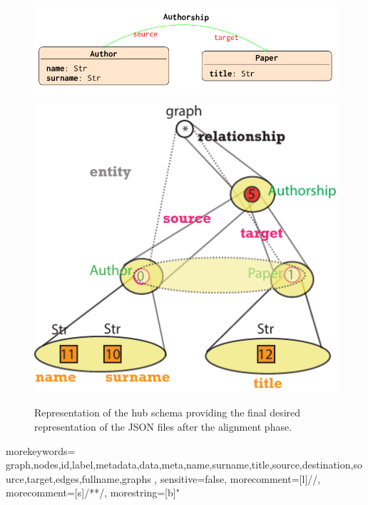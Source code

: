 \begin{figure}[!t]
	\centering
	\begin{minipage}[!t]{0.8\textwidth}
		\centering
		\includegraphics{fig/04model/06schema}
		\label{fig:schemawithsemantics}
	\end{minipage}
	
	\begin{minipage}[!t]{0.5\textwidth}
		\centering
		\includegraphics{fig/04model/01NestedToMatch.pdf}
		\label{subfig:nestedhubforbiblio}
	\end{minipage}
	
	\caption{Representation of the hub schema providing the final desired representation of the JSON files after the alignment phase.}
\end{figure}
{
  morekeywords={
graph,nodes,id,label,metadata,data,meta,name,surname,title,source,destination,source,target,edges,fullname,graphs
  },
  sensitive=false, %
  morecomment=[l]{//}, %
  morecomment=[s]{/*}{*/}, %
  morestring=[b]" %
}

